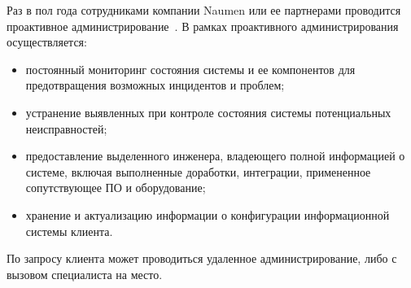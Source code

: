 Раз в пол года сотрудниками компании Naumen или ее партнерами проводится проактивное администрирование~\cite{naumen:support}.
В рамках проактивного администрирования осуществляется:
\begin{itemize}
    \item постоянный мониторинг состояния системы и ее компонентов для предотвращения возможных
    инцидентов и проблем;
    \item устранение выявленных при контроле состояния системы потенциальных неисправностей;
    \item предоставление выделенного инженера, владеющего полной информацией о системе, включая
    выполненные доработки, интеграции, примененное сопутствующее ПО и оборудование;
    \item хранение и актуализацию информации о конфигурации информационной системы клиента.
\end{itemize}

По запросу клиента может проводиться удаленное администрирование, либо с вызовом специалиста на место.